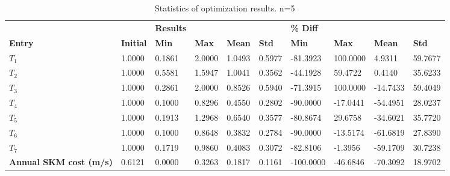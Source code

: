 \begin{table}[H]
\centering
\begin{tabular}{llllllllll}
\textbf{} & \textbf{} & \cellcolor[HTML]{EFEFEF}\textbf{Results} & \cellcolor[HTML]{EFEFEF} & \cellcolor[HTML]{EFEFEF} & \cellcolor[HTML]{EFEFEF} & \cellcolor[HTML]{EFEFEF}\textbf{\% Diff} & \cellcolor[HTML]{EFEFEF} & \cellcolor[HTML]{EFEFEF} & \cellcolor[HTML]{EFEFEF} \\
\rowcolor[HTML]{EFEFEF} 
\textbf{Entry} & \textbf{Initial} & \textbf{Min} & \textbf{Max} & \textbf{Mean} & \textbf{Std} & \textbf{Min} & \textbf{Max} & \textbf{Mean} & \textbf{Std} \\
$T_{1}$ & 1.0000 & 0.1861 & 2.0000 & 1.0493 & 0.5977 & -81.3923 & 100.0000 & 4.9311 & 59.7677 \\ 
$T_{2}$ & 1.0000 & 0.5581 & 1.5947 & 1.0041 & 0.3562 & -44.1928 & 59.4722 & 0.4140 & 35.6233 \\ 
$T_{3}$ & 1.0000 & 0.2861 & 2.0000 & 0.8526 & 0.5940 & -71.3915 & 100.0000 & -14.7433 & 59.4049 \\ 
$T_{4}$ & 1.0000 & 0.1000 & 0.8296 & 0.4550 & 0.2802 & -90.0000 & -17.0441 & -54.4951 & 28.0237 \\ 
$T_{5}$ & 1.0000 & 0.1913 & 1.2968 & 0.6540 & 0.3577 & -80.8674 & 29.6758 & -34.6021 & 35.7720 \\ 
$T_{6}$ & 1.0000 & 0.1000 & 0.8648 & 0.3832 & 0.2784 & -90.0000 & -13.5174 & -61.6819 & 27.8390 \\ 
$T_{7}$ & 1.0000 & 0.1719 & 0.9860 & 0.4083 & 0.3072 & -82.8106 & -1.3956 & -59.1709 & 30.7238 \\ 
\rowcolor[HTML]{EFEFEF} 
\textbf{Annual SKM cost (m/s)} & 0.6121 & 0.0000 & 0.3263 & 0.1817 & 0.1161 & -100.0000 & -46.6846 & -70.3092 & 18.9702 \\ 
\end{tabular}
\caption{Statistics of optimization results. n=5}
\label{tab:StatisticsOptimizationAnalysis}
\end{table}